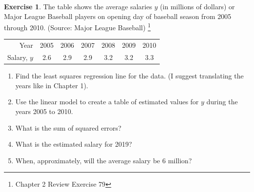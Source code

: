 \documentclass[handout]{beamer}
\newcommand{\blfootnote}[1]{%
	\begingroup
	\renewcommand\thefootnote{}\footnote{#1}%
	\addtocounter{footnote}{-1}%
	\endgroup
}
\newcommand{\fn}{\insertframenumber}
\theoremstyle{definition}
\newtheorem{exercise}{Exercise}
\begin{document}
\begin{frame}{\fn}
\begin{exercise}
	The table shows the average salaries $y$ (in millions of dollars) or Major League Baseball players on opening day of baseball season from 2005 through 2010. (Source: Major League Baseball)\blfootnote{Chapter 2 Review Exercise 79}
	\begin{center}
		\begin{tabular}{r|cccccc}
			\hline
			Year & 2005&2006&2007 & 2008 & 2009 & 2010\\
			Salary, $y$ & 2.6&2.9 & 2.9&3.2&3.2&3.3\\
			\hline
		\end{tabular}
	\end{center}
	\begin{enumerate}[label=(\alph*)]
		\item Find the least squares regression line for the data. (I suggest translating the years like in Chapter 1).
		\item Use the linear model to create a table of estimated values for $y$ during the years 2005 to 2010.
		\item What is the sum of squared errors?
		\item What is the estimated salary for 2019?
		\item When, approximately, will the average salary be 6 million?
	\end{enumerate}
\end{exercise}
\end{frame}
\end{document}
